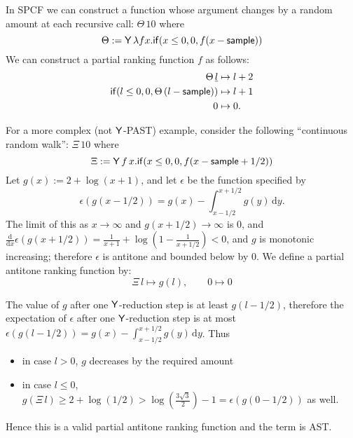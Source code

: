 \begin{example}\label{ex:raven complex}
In SPCF we can construct a function whose argument changes by a random amount at each recursive call: $\Theta \, 10$ where
\[
\Theta := \mathsf{Y} \, \lambda f x . \mathsf{if}(x \leq 0, 0, f(x - \mathsf{sample}))
\]
We can construct a partial ranking function $f$ as follows:
\begin{align*}
\Theta \, \underline l 
&\mapsto 
l + 2
\\
\mathsf{if}(l \leq 0, 0, \Theta \, (l - \mathsf{sample}))
&\mapsto
l + 1
\\
0 &\mapsto 0.
\end{align*}

For a more complex (not $\mathsf{Y}$-PAST) example, consider the following ``continuous random walk'': $\Xi \, 10$ where
\[
\Xi := \mathsf{Y} \, f \, x . \mathsf{if}(x \leq 0, 0, f(x - \mathsf{sample} + 1/2)) 
\]
Let $g(x) := 2 + \log(x + 1)$, and let $\epsilon$ be the function specified by
\[
\epsilon(g(x-1/2)) = g(x) - \int_{x-1/2}^{x+1/2}g(y) \, \mathrm d y.
\]
The limit of this as $x \to \infty$ and $g(x+1/2) \to \infty$ is 0, and $\frac {\mathrm d}{\mathrm dx} \epsilon(g(x+1/2)) = \frac 1 {x+1} + \log(1 - \frac 1 {x + 1/2}) < 0$, and $g$ is monotonic increasing; 
therefore $\epsilon$ is antitone and bounded below by 0.
We define a partial antitone ranking function by:
\[
\Xi \, l 
\mapsto 
g(l), \qquad 
0 \mapsto 0
\]

The value of $g$ after one $\mathsf{Y}$-reduction step is at least $g(l-1/2)$, therefore the expectation of $\epsilon$ after one $\mathsf{Y}$-reduction step is at most $\epsilon(g(l-1/2)) = g(x) - \int_{x-1/2}^{x+1/2}g(y) \, \mathrm d y$. 
Thus 
\begin{itemize}
\item in case $l > 0$, $g$ decreases by the required amount
\item in case $l \leq 0$, 
\(
g(\Xi \, l) \geq 2 + \log(1/2) > \log(\frac{3 \sqrt 3} 2) - 1 = \epsilon(g(0-1/2))
\) 
as well.
\end{itemize}
Hence this is a valid partial antitone ranking function and the term is AST.
\end{example}

